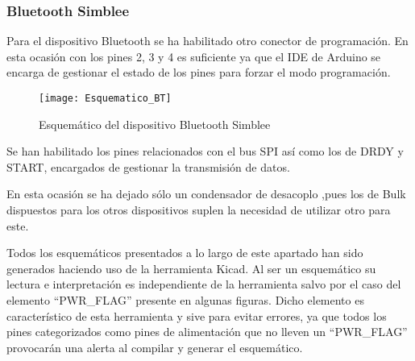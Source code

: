 \subsubsection{Bluetooth Simblee\label{sec:Esquematico_BT}}

Para el dispositivo Bluetooth se ha habilitado otro conector de programación. En esta ocasión con los pines 2, 3 y 4 es suficiente ya que el \acrshort{IDE} de Arduino se encarga de gestionar el estado de los pines para forzar el modo programación.

\begin{figure} [h]
    \centering
    \texttt{[image: Esquematico\_BT]}
    \caption{Esquemático del dispositivo Bluetooth Simblee}
    \label{fig:Esquematico_BT}
\end{figure}

Se han habilitado los pines relacionados con el bus \acrshort{SPI} así como los de DRDY y START, encargados de gestionar la transmisión de datos.

En esta ocasión se ha dejado sólo un condensador de desacoplo ,pues los de Bulk dispuestos para los otros dispositivos suplen la necesidad de utilizar otro para este.

Todos los esquemáticos presentados a lo largo de este apartado han sido generados haciendo uso de la herramienta Kicad. Al ser un esquemático su lectura e interpretación es independiente de la herramienta salvo por el caso del elemento ``PWR\_FLAG'' presente en algunas figuras. Dicho elemento es característico de esta herramienta y sive para evitar errores, ya que todos los pines categorizados como pines de alimentación que no lleven un ``PWR\_FLAG'' provocarán una alerta al compilar y generar el esquemático.